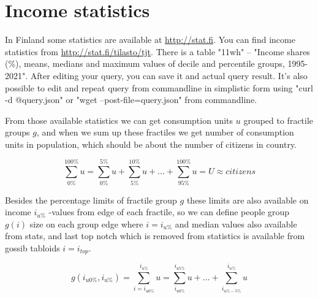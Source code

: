 %
%
%

\chapter{Income statistics}
\label{statistics}
In Finland some statistics are available at \url{http://stat.fi}.
You can find income statistics from \url{http://stat.fi/tilasto/tjt}.
There is a table "11wh" -- "Income shares (\%),
means, medians and maximum values of decile and percentile groups, 1995-2021".
After editing your query, you can save it and actual query result.
It's also possible to edit and repeat query from commandline in simplistic form
using "curl -d @query.json" or "wget --post-file=query.json" from commandline.

From those available statistics we can get consumption units
$u$ grou\-ped to fractile groups $g$,
and when we sum up these fractiles we get number of consumption units in population,
which should be about the number of citizens in country.  

\begin{equation} \label{eq:fractile_units_sum}
	\sum_{0\%}^{100\%} u =
	\sum_{0\%}^{5\%} u +
	\sum_{5\%}^{10\%} u +
	...+
	\sum_{95\%}^{100\%} u = U \approx citizens
\end{equation}

Besides the percentage limits of fractile group $g$
these limits are also available on income $i_{u\%}$ -values from edge of each fractile,
so we can define people group $g(i)$ size on each group edge where
$i=i_{u\%}$ and median values also available from stats,
and last top notch which is removed from statistics is available from gossib tabloids
$i=i_{top}$.

\begin{equation} \label{eq:fractile_units_group}
	g(i_{u0\%},i_{u\%})=
        \sum_{i=i_{u0\%}}^{i_{u\%}} u =
	\sum_{i_{u0\%}}^{i_{u5\%}} u+
	...+
	\sum_{i_{u\%-5\%}}^{i_{u\%}} u
\end{equation}

